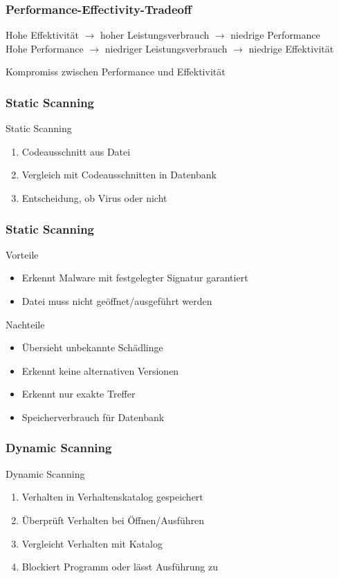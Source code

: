 \documentclass{beamer}
\begin{document}
\begin{frame}
\frametitle{Performance-Effectivity-Tradeoff}
Hohe Effektivität $\rightarrow$ hoher Leistungsverbrauch $\rightarrow$ niedrige Performance\\
Hohe Performance $\rightarrow$ niedriger Leistungsverbrauch $\rightarrow$ niedrige Effektivität

\begin{block}{}
	Kompromiss zwischen Performance und Effektivität
\end{block}
\end{frame}


\begin{frame}
\frametitle{Static Scanning}
\begin{block}{Static Scanning}
	\begin{enumerate}
		\item Codeausschnitt aus Datei
		\item Vergleich mit Codeausschnitten in Datenbank
		\item Entscheidung, ob Virus oder nicht
	\end{enumerate}
\end{block} 
\end{frame}

\begin{frame}
	\frametitle{Static Scanning}
	\begin{block}{Vorteile}
		\begin{itemize}
			\item Erkennt Malware mit festgelegter Signatur garantiert
			\item Datei muss nicht geöffnet/ausgeführt werden
		\end{itemize}
	\end{block} 
	\begin{block}{Nachteile}
		\begin{itemize}
			\item Übersieht unbekannte Schädlinge
			\item Erkennt keine alternativen Versionen
			\item Erkennt nur exakte Treffer
			\item Speicherverbrauch für Datenbank
		\end{itemize}
	\end{block}
\end{frame}

\begin{frame}
\frametitle{Dynamic Scanning}
\begin{block}{Dynamic Scanning}
	\begin{enumerate}
		\item Verhalten in Verhaltenskatalog gespeichert
		\item Überprüft Verhalten bei Öffnen/Ausführen
		\item Vergleicht Verhalten mit Katalog
		\item Blockiert Programm oder lässt Ausführung zu
	\end{enumerate}
	
\end{block} 
\end{frame}
\end{document}

